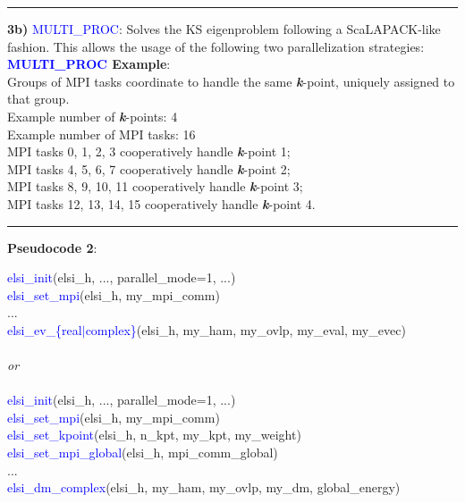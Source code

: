 \documentclass{report}
\begin{document}
\noindent\rule{18cm}{0.4pt}

\bigskip
\textbf{3b)} \textcolor{blue}{MULTI\_PROC}:  Solves the KS eigenproblem following a ScaLAPACK-like fashion.  This allows the usage of the following two parallelization strategies:\\

\textbf{\textcolor{blue}{MULTI\_PROC} Example}:\\

Groups of MPI tasks coordinate to handle the same \textbf{\textit{k}}-point, uniquely assigned to that group.\\

Example number of \textbf{\textit{k}}-points:  4\\
Example number of MPI tasks:  16\\

MPI tasks  0,  1,  2,  3 cooperatively handle \textbf{\textit{k}}-point 1;\\
MPI tasks  4,  5,  6,  7 cooperatively handle \textbf{\textit{k}}-point 2;\\
MPI tasks  8,  9, 10, 11 cooperatively handle \textbf{\textit{k}}-point 3;\\
MPI tasks 12, 13, 14, 15 cooperatively handle \textbf{\textit{k}}-point 4.\\

\newpage
\noindent\rule{18cm}{0.4pt}

\textbf{Pseudocode 2}:\\

\begin{algorithm}[H]
\textcolor{blue}{elsi\_init}(elsi\_h, ..., parallel\_mode=1, ...)\\
\textcolor{blue}{elsi\_set\_mpi}(elsi\_h, my\_mpi\_comm)\\
...\\
\textcolor{blue}{elsi\_ev\_\{real$\vert$complex\}}(elsi\_h, my\_ham, my\_ovlp, my\_eval, my\_evec)\\
~\\
\textit{or}\\
~\\
\textcolor{blue}{elsi\_init}(elsi\_h, ..., parallel\_mode=1, ...)\\
\textcolor{blue}{elsi\_set\_mpi}(elsi\_h, my\_mpi\_comm)\\
\textcolor{blue}{elsi\_set\_kpoint}(elsi\_h, n\_kpt, my\_kpt, my\_weight)\\
\textcolor{blue}{elsi\_set\_mpi\_global}(elsi\_h, mpi\_comm\_global)\\
...\\
\textcolor{blue}{elsi\_dm\_complex}(elsi\_h, my\_ham, my\_ovlp, my\_dm, global\_energy)\\
\end{algorithm}
\end{document}
